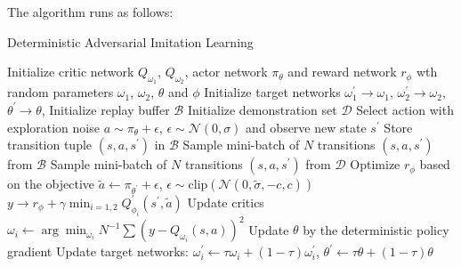 The algorithm runs as follows:

\begin{algorithm}
\caption{Deterministic Adversarial Imitation Learning}
\begin{algorithmic}[1] %
\STATE Initialize critic network $Q_{\omega_1}$, $Q_{\omega_2}$, actor network $\pi_{\theta}$ and reward network $r_{\phi}$ wth random parameters $\omega_1$, $\omega_2$, $\theta$ and $\phi$
\STATE Initialize target networks $\omega_1^\prime\rightarrow\omega_1$, $\omega_2^\prime\rightarrow\omega_2$, $\theta^\prime\rightarrow\theta$,
\STATE Initialize replay buffer $\mathcal{B}$
\STATE Initialize demonstration set $\mathcal{D}$
\STATE Select action with exploration noise $a\sim\pi_{\theta} + \epsilon$, $\epsilon\sim \mathcal{N}(0, \sigma)$ and observe new state $s^\prime$
\STATE Store transition tuple $(s, a, s^\prime)$ in $\mathcal{B}$
\STATE Sample mini-batch of $N$ transitions $(s, a, s^\prime)$ from $\mathcal{B}$
\STATE Sample mini-batch of $N$ transitions $(s, a, s^\prime)$ from $\mathcal{D}$
\STATE Optimize $r_{\phi}$ based on the objective
\ENDIF
\STATE $\tilde{a} \leftarrow \pi_{\theta^\prime}+\epsilon$, $\epsilon\sim \text{clip}(\mathcal{N}(0, \tilde{\sigma}, -c, c))$
\STATE $y\rightarrow r_{\phi}+\gamma \min_{i=1, 2}Q_{\phi_i}^\prime(s^\prime, \tilde{a})$
\STATE Update critics $\omega_i\leftarrow \arg\min_{\omega_i} N^{-1}\sum(y - Q_{\omega_i}(s, a))^2$
\STATE Update $\theta$ by the deterministic policy gradient
\STATE Update target networks: $\omega_i^\prime\leftarrow \tau \omega_i + (1-\tau)\omega_i^\prime$, $\theta^\prime \leftarrow \tau \theta + (1-\tau)\theta $
\ENDIF
\ENDFOR
\end{algorithmic}
\end{algorithm}
